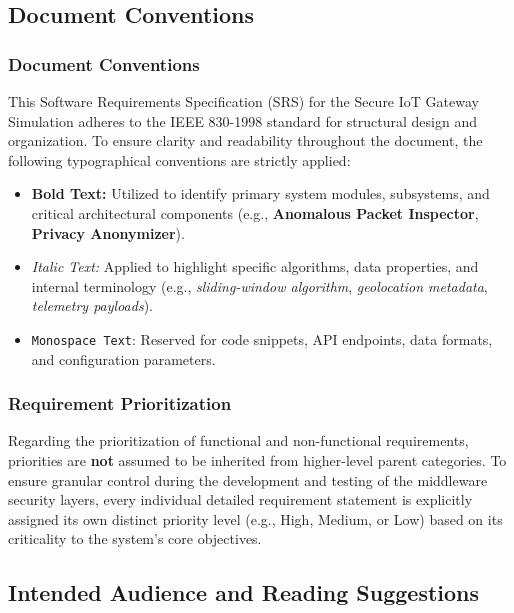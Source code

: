 \documentclass[12pt,letterpaper]{article}
\begin{document}
\subsection{Document Conventions}
\subsubsection{Document Conventions}
\clearpage
This Software Requirements Specification (SRS) for the Secure IoT Gateway Simulation adheres to the IEEE 830-1998 standard for structural design and organization. To ensure clarity and readability throughout the document, the following typographical conventions are strictly applied:\par
\begin{itemize}
\item \textbf{Bold Text:} Utilized to identify primary system modules, subsystems, and critical architectural components (e.g., \textbf{Anomalous Packet Inspector}, \textbf{Privacy Anonymizer}).
\item \emph{Italic Text:} Applied to highlight specific algorithms, data properties, and internal terminology (e.g., \emph{sliding-window algorithm}, \emph{geolocation metadata}, \emph{telemetry payloads}).
\item \texttt{Monospace Text}: Reserved for code snippets, API endpoints, data formats, and configuration parameters.
\end{itemize}
\subsubsection{Requirement Prioritization}
Regarding the prioritization of functional and non-functional requirements, priorities are \textbf{not} assumed to be inherited from higher-level parent categories. To ensure granular control during the development and testing of the middleware security layers, every individual detailed requirement statement is explicitly assigned its own distinct priority level (e.g., High, Medium, or Low) based on its criticality to the system's core objectives.\par
\vspace{0.08in}
\subsection{Intended Audience and Reading Suggestions}
\end{document}
